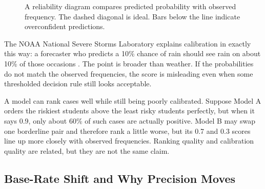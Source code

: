 \begin{figure}[t]
{%
}
\caption{A reliability diagram compares predicted probability with observed frequency. The dashed diagonal is ideal. Bars below the line indicate overconfident predictions.}
\label{fig:reliability-diagram}
\end{figure}

\begin{example}
The NOAA National Severe Storms Laboratory explains calibration in exactly this way: a forecaster who predicts a 10\% chance of rain should see rain on about 10\% of those occasions \citep{noaa_reliability}. The point is broader than weather. If the probabilities do not match the observed frequencies, the score is misleading even when some thresholded decision rule still looks acceptable.
\end{example}

\begin{example}
A model can rank cases well while still being poorly calibrated. Suppose Model A orders the riskiest students above the least risky students perfectly, but when it says 0.9, only about 60\% of such cases are actually positive. Model B may swap one borderline pair and therefore rank a little worse, but its 0.7 and 0.3 scores line up more closely with observed frequencies. Ranking quality and calibration quality are related, but they are not the same claim.
\end{example}

\subsection{Base-Rate Shift and Why Precision Moves}

